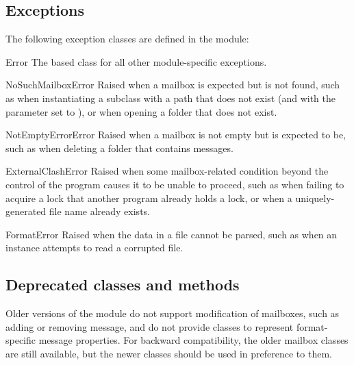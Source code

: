 \subsection{Exceptions}

The following exception classes are defined in the  module:

\begin{classdesc}{Error}{}
The based class for all other module-specific exceptions.
\end{classdesc}

\begin{classdesc}{NoSuchMailboxError}{}
Raised when a mailbox is expected but is not found, such as when instantiating
a  subclass with a path that does not exist (and with the
 parameter set to ), or when opening a folder that does
not exist.
\end{classdesc}

\begin{classdesc}{NotEmptyErrorError}{}
Raised when a mailbox is not empty but is expected to be, such as when deleting
a folder that contains messages.
\end{classdesc}

\begin{classdesc}{ExternalClashError}{}
Raised when some mailbox-related condition beyond the control of the program
causes it to be unable to proceed, such as when failing to acquire a lock that
another program already holds a lock, or when a uniquely-generated file name
already exists.
\end{classdesc}

\begin{classdesc}{FormatError}{}
Raised when the data in a file cannot be parsed, such as when an 
instance attempts to read a corrupted  file.
\end{classdesc}

\subsection{Deprecated classes and methods}
\label{mailbox-deprecated}

Older versions of the  module do not support modification of
mailboxes, such as adding or removing message, and do not provide classes to
represent format-specific message properties. For backward compatibility, the
older mailbox classes are still available, but the newer classes should be used
in preference to them.

